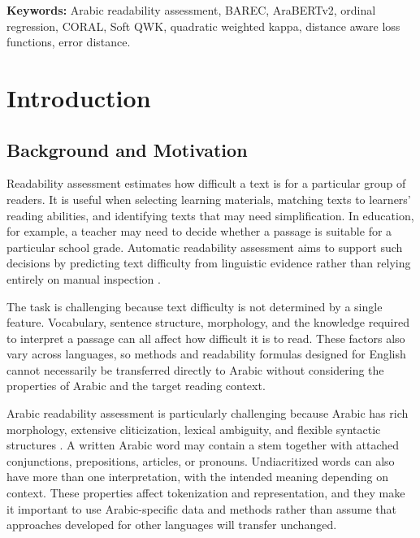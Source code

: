 \documentclass[12pt]{report}
\begin{document}
{\textbf{Keywords:}} Arabic readability assessment, BAREC, AraBERTv2, ordinal regression, CORAL, Soft QWK, quadratic weighted kappa, distance aware loss functions, error distance.




\tableofcontents


\chapter{Introduction}\label{chap:introduction}

\section{Background and Motivation}

Readability assessment estimates how difficult a text is for a particular group of readers. It is useful when selecting learning materials, matching texts to learners' reading abilities, and identifying texts that may need simplification. In education, for example, a teacher may need to decide whether a passage is suitable for a particular school grade. Automatic readability assessment aims to support such decisions by predicting text difficulty from linguistic evidence rather than relying entirely on manual inspection \cite{dubay2004principles,vajjala2022trends}.

The task is challenging because text difficulty is not determined by a single feature. Vocabulary, sentence structure, morphology, and the knowledge required to interpret a passage can all affect how difficult it is to read. These factors also vary across languages, so methods and readability formulas designed for English cannot necessarily be transferred directly to Arabic without considering the properties of Arabic and the target reading context.

Arabic readability assessment is particularly challenging because Arabic has rich morphology, extensive cliticization, lexical ambiguity, and flexible syntactic structures \cite{nassiri2023approaches}. A written Arabic word may contain a stem together with attached conjunctions, prepositions, articles, or pronouns. Undiacritized words can also have more than one interpretation, with the intended meaning depending on context. These properties affect tokenization and representation, and they make it important to use Arabic-specific data and methods rather than assume that approaches developed for other languages will transfer unchanged.
\end{document}
